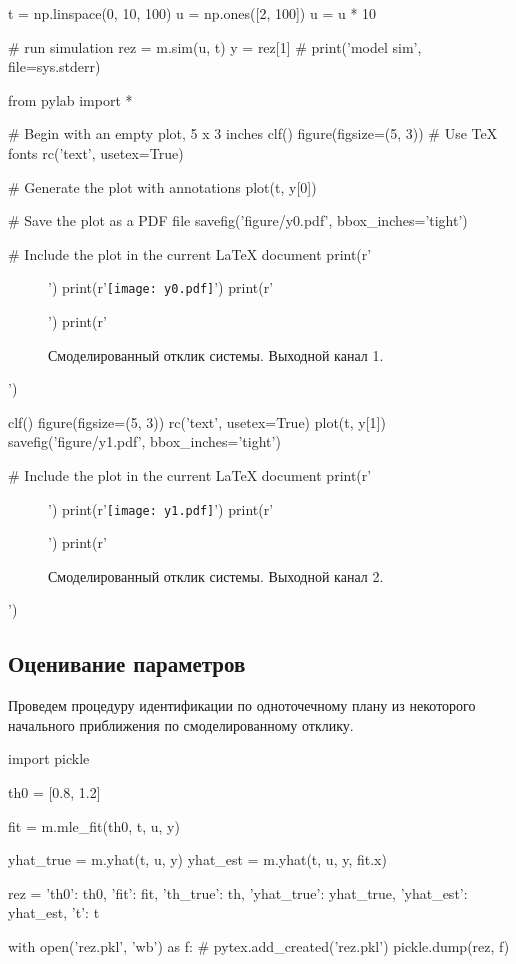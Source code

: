 \documentclass[a4paper,14pt]{extarticle}
\begin{document}
\begin{pycode}[model]
t = np.linspace(0, 10, 100)
u = np.ones([2, 100])
u = u * 10

# run simulation
rez = m.sim(u, t)
y = rez[1]
# print('model sim', file=sys.stderr)
\end{pycode}

\begin{pycode}[model]
from pylab import *

# Begin with an empty plot, 5 x 3 inches
clf()
figure(figsize=(5, 3))
# Use TeX fonts
rc('text', usetex=True)

# Generate the plot with annotations
plot(t, y[0])

# Save the plot as a PDF file
savefig('figure/y0.pdf', bbox_inches='tight')

# Include the plot in the current LaTeX document
print(r'\begin{figure}[H]')
print(r'\texttt{[image: y0.pdf]}')
print(r'\caption{Смоделированный отклик системы. Выходной канал 1.}')
print(r'\end{figure}')

clf()
figure(figsize=(5, 3))
rc('text', usetex=True)
plot(t, y[1])
savefig('figure/y1.pdf', bbox_inches='tight')

# Include the plot in the current LaTeX document
print(r'\begin{figure}[H]')
print(r'\texttt{[image: y1.pdf]}')
print(r'\caption{Смоделированный отклик системы. Выходной канал 2.}')
print(r'\end{figure}')
\end{pycode}
\renewcommand{\baselinestretch}{1.5}

\subsection{Оценивание параметров}

Проведем процедуру идентификации по одноточечному плану из некоторого
начального приближения по смоделированному отклику.

\begin{pycode}[model]
import pickle

th0 = [0.8, 1.2]


fit = m.mle_fit(th0, t, u, y)


yhat_true = m.yhat(t, u, y)
yhat_est = m.yhat(t, u, y, fit.x)

rez = {'th0': th0, 'fit': fit, 'th_true': th, 'yhat_true': yhat_true,
	'yhat_est': yhat_est, 't': t}

with open('rez.pkl', 'wb') as f:
	# pytex.add_created('rez.pkl')
	pickle.dump(rez, f)

\end{pycode}
\end{document}
